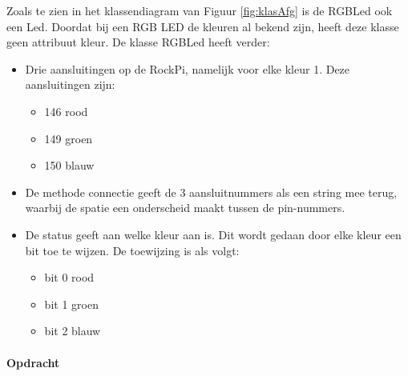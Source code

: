 Zoals te zien in het klassendiagram van Figuur \ref{fig:klasAfg} is de RGBLed ook een Led. Doordat bij een RGB LED de kleuren al bekend zijn, heeft deze klasse geen attribuut kleur. De klasse RGBLed heeft verder:
\begin{itemize}
	\item Drie aansluitingen op de RockPi, namelijk voor elke kleur 1. Deze aansluitingen zijn:
	\begin{itemize}
		\item 146 rood
		\item 149 groen
		\item 150 blauw
	\end{itemize}
    \item De methode connectie geeft de 3 aansluitnummers als een string mee terug, waarbij de spatie een onderscheid maakt tussen de pin-nummers.
    \item De status geeft aan welke kleur aan is. Dit wordt gedaan door elke kleur een bit toe te wijzen. De toewijzing is als volgt:
    \begin{itemize}
    	\item bit 0 rood
    	\item bit 1 groen
    	\item bit 2 blauw
    \end{itemize}

\end{itemize}
\newpage
 \paragraph{Opdracht}
 
